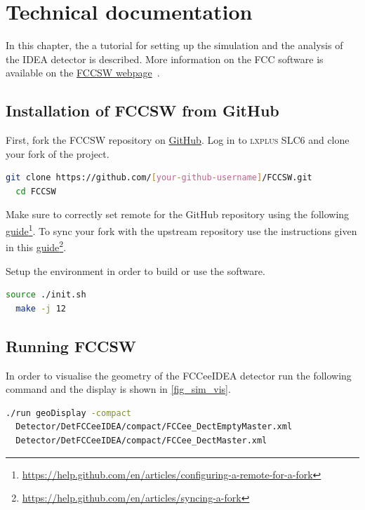 \section{Technical documentation}

In this chapter, the a tutorial for setting up the simulation and the analysis of the IDEA detector is described. More information on the FCC software is available on the \href{http://fccsw.web.cern.ch/fccsw/}{FCCSW webpage}~\cite{FCCSW}.

\subsection{Installation of FCCSW from GitHub}

First, fork the FCCSW repository on \href{https://github.com/HEP-FCC/FCCSW}{GitHub}. Log in to \textsc{lxplus SLC6} and clone your fork of the project.

\begin{lstlisting}[language=bash,caption={Clone your fork of the FCCSW repository.}]
  git clone https://github.com/[your-github-username]/FCCSW.git
  cd FCCSW
\end{lstlisting}

Make sure to correctly set remote for the GitHub repository using the following \href{https://help.github.com/en/articles/configuring-a-remote-for-a-fork}{guide}\footnote{\href{https://help.github.com/en/articles/configuring-a-remote-for-a-fork}{https://help.github.com/en/articles/configuring-a-remote-for-a-fork}}. To sync your fork with the upstream repository use the instructions given in this \href{https://help.github.com/en/articles/syncing-a-fork}{guide}\footnote{\href{https://help.github.com/en/articles/syncing-a-fork}{https://help.github.com/en/articles/syncing-a-fork}}.

Setup the environment in order to build or use the software.
\begin{lstlisting}[language=bash,caption={Setup the environment and compile.}]
  source ./init.sh
  make -j 12
\end{lstlisting}

\subsection{Running FCCSW}

In order to visualise the geometry of the FCCeeIDEA detector run the following command and the display is shown in \cref{fig_sim_vis}.

\begin{lstlisting}[language=bash,caption={Visualise the full geometry of the FCCeeIDEA detector.}]
./run geoDisplay -compact
  Detector/DetFCCeeIDEA/compact/FCCee_DectEmptyMaster.xml
  Detector/DetFCCeeIDEA/compact/FCCee_DectMaster.xml
\end{lstlisting}

